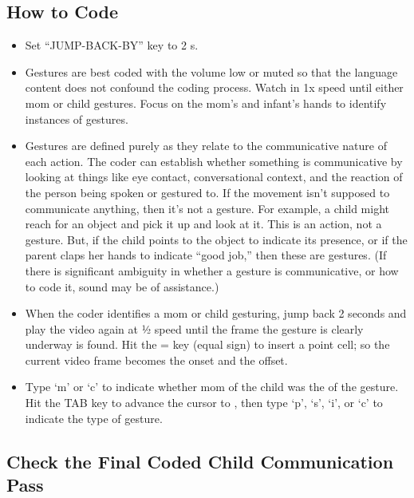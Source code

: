 \documentclass[
  12pt,
]{book}
\providecommand{\tightlist}{%
  \setlength{\itemsep}{0pt}\setlength{\parskip}{0pt}}
\begin{document}
\hypertarget{how-to-code-2}{%
\subsection*{How to Code}\label{how-to-code-2}}

\begin{itemize}
\tightlist
\item
  Set ``JUMP-BACK-BY'' key to 2 s.
\item
  Gestures are best coded with the volume low or muted so that the language content does not confound the coding process.
  Watch in 1x speed until either mom or child gestures. Focus on the mom's and infant's hands to identify instances of gestures.
\item
  Gestures are defined purely as they relate to the communicative nature of each action. The coder can establish whether something is communicative by looking at things like eye contact, conversational context, and the reaction of the person being spoken or gestured to. If the movement isn't supposed to communicate anything, then it's not a gesture. For example, a child might reach for an object and pick it up and look at it. This is an action, not a gesture. But, if the child points to the object to indicate its presence, or if the parent claps her hands to indicate ``good job,'' then these are gestures. (If there is significant ambiguity in whether a gesture is communicative, or how to code it, sound may be of assistance.)
\item
  When the coder identifies a mom or child gesturing, jump back 2 seconds and play the video again at ½ speed until the frame the gesture is clearly underway is found. Hit the = key (equal sign) to insert a point cell; so the current video frame becomes the onset and the offset.
\item
  Type `m' or `c' to indicate whether mom of the child was the of the gesture. Hit the TAB key to advance the cursor to , then type `p', `s', `i', or `c' to indicate the type of gesture.
\end{itemize}

\hypertarget{check-the-final-coded-child-communication-pass}{%
\subsection*{Check the Final Coded Child Communication Pass}\label{check-the-final-coded-child-communication-pass}}
\end{document}
